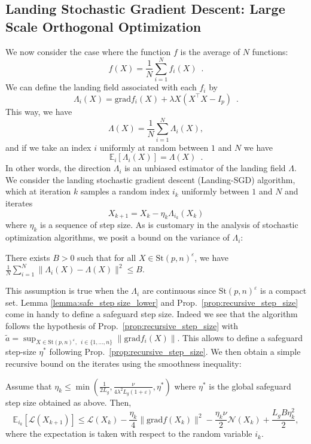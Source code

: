 \documentclass[twoside,11pt]{article}
\newcommand{\grad}{{\mathrm{grad}}}
\newcommand{\stiefel}{{\mathrm{St}(p, n)}}
\newcommand{\revision}[1]{{#1}}
\begin{document}
%


%



\subsection{Landing Stochastic Gradient Descent: Large Scale Orthogonal Optimization}
\label{subsec:sgd}
We now consider the case where the function $f$ is the average of $N$ functions:
$$
f(X) = \frac1N\sum_{i=1}^Nf_i(X)\enspace .
$$
We can define the landing field associated with each $f_i$ by
$$
\Lambda_i(X) = \grad f_i(X) + \lambda X(X^{\top}X -I_p)\enspace .
$$
This way, we have
$$
\Lambda(X)= \frac1N\sum_{i=1}^N\Lambda_i(X),
$$
and if we take an index $i$ uniformly at random between $1$ and $N$ we have 
$$
\mathbb{E}_i[\Lambda_i(X)] = \Lambda(X)\enspace.
$$
In other words, the direction $\Lambda_i$ is an unbiased estimator of the landing field $\Lambda$.
We consider the landing stochastic gradient descent (Landing-SGD) algorithm, which at iteration $k$ samples a random index $i_k$ uniformly between $1$ and $N$ and iterates
\begin{equation}
    \label{eq:stochastic_landing}
    X_{k+1} = X_k - \eta_k \Lambda_{i_k}(X_k)
\end{equation}
where $\eta_k$ is a sequence of step size.
As is customary in the analysis of stochastic optimization algorithms, we posit a bound on the variance of $\Lambda_i$:

\begin{assumption}
There exists $B> 0$ such that for all $X\in\stiefel^\varepsilon$, we have 
$\frac1N\sum_{i=1}^N\|\Lambda_i(X) -\Lambda(X)\|^2\leq B$.
\end{assumption}
This assumption is true when the $\Lambda_i$ are continuous since $\stiefel^\varepsilon$ is a compact set.
\revision{Lemma \ref{lemma:safe_step size_lower} and Prop.~\ref{prop:recursive_step_size} come in handy to define a safeguard step size.
Indeed we see that the algorithm follows the hypothesis of Prop.~\ref{prop:recursive_step_size} with 
$\tilde{a} = \sup_{X\in \stiefel^\varepsilon, \enspace i \in\{1,\dots, n\}}\|\grad f_i(X)\|$. 
This allows to define a safeguard step-size $\eta^*$ following Prop.~\ref{prop:recursive_step_size}.
}
We then obtain a simple recursive bound on the iterates using the smoothness inequality:
\begin{proposition}
\label{prop:decrease_stochastic}
  Assume that $\eta_k\leq \min(\frac1{2L_g}, \frac{\nu}{4\lambda^2L_g(1+\varepsilon)}, \eta^*)$ where $\eta^*$ is the global safeguard step size obtained as above. Then, 
  $$
  \mathbb{E}_{i_k}[\mathcal{L}(X_{k+1})] \leq \mathcal{L}(X_k) - \frac{\eta_k}4 \|\grad f(X_k)\|^2 - \frac{\eta_k\nu}2\mathcal{N}(X_k) + \frac{L_g B\eta_k^2}2,
  $$
  where the expectation is taken with respect to the random variable $i_k$.
\end{proposition}
\end{document}
